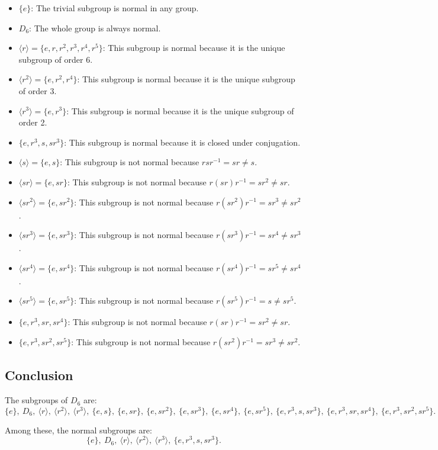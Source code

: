 \documentclass[12pt]{amsart}
\theoremstyle{definition}
\numberwithin{equation}{section}
\begin{document}
\begin{exercise}{2}
    \begin{itemize}[label=--]
        \item \(\{e\}\): The trivial subgroup is normal in any group.
        \item \(D_6\): The whole group is always normal.
        \item \(\langle r \rangle = \{e, r, r^2, r^3, r^4, r^5\}\): This subgroup is normal because it is the unique subgroup of order 6.
        \item \(\langle r^2 \rangle = \{e, r^2, r^4\}\): This subgroup is normal because it is the unique subgroup of order 3.
        \item \(\langle r^3 \rangle = \{e, r^3\}\): This subgroup is normal because it is the unique subgroup of order 2.
        \item \(\{e, r^3, s, sr^3\}\): This subgroup is normal because it is closed under conjugation.
        \item \(\langle s \rangle = \{e, s\}\): This subgroup is not normal because \(r s r^{-1} = sr \neq s\).
        \item \(\langle sr \rangle = \{e, sr\}\): This subgroup is not normal because \(r (sr) r^{-1} = sr^2 \neq sr\).
        \item \(\langle sr^2 \rangle = \{e, sr^2\}\): This subgroup is not normal because \(r (sr^2) r^{-1} = sr^3 \neq sr^2\).
        \item \(\langle sr^3 \rangle = \{e, sr^3\}\): This subgroup is not normal because \(r (sr^3) r^{-1} = sr^4 \neq sr^3\).
        \item \(\langle sr^4 \rangle = \{e, sr^4\}\): This subgroup is not normal because \(r (sr^4) r^{-1} = sr^5 \neq sr^4\).
        \item \(\langle sr^5 \rangle = \{e, sr^5\}\): This subgroup is not normal because \(r (sr^5) r^{-1} = s \neq sr^5\).
        \item \(\{e, r^3, sr, sr^4\}\): This subgroup is not normal because \(r (sr) r^{-1} = sr^2 \neq sr\).
        \item \(\{e, r^3, sr^2, sr^5\}\): This subgroup is not normal because \(r (sr^2) r^{-1} = sr^3 \neq sr^2\).
    \end{itemize}

    \subsection*{Conclusion}

    The subgroups of \(D_6\) are:
    \[
    \{e\}, \ D_6, \ \langle r \rangle, \ \langle r^2 \rangle, \ \langle r^3 \rangle, \ \{e, s\}, \ \{e, sr\}, \ \{e, sr^2\}, \ \{e, sr^3\}, \ \{e, sr^4\}, \ \{e, sr^5\}, \ \{e, r^3, s, sr^3\}, \ \{e, r^3, sr, sr^4\}, \ \{e, r^3, sr^2, sr^5\}.
    \]

    Among these, the normal subgroups are:
    \[
    \{e\}, \ D_6, \ \langle r \rangle, \ \langle r^2 \rangle, \ \langle r^3 \rangle, \ \{e, r^3, s, sr^3\}.
    \]

\end{exercise}
\newpage
\end{document}
